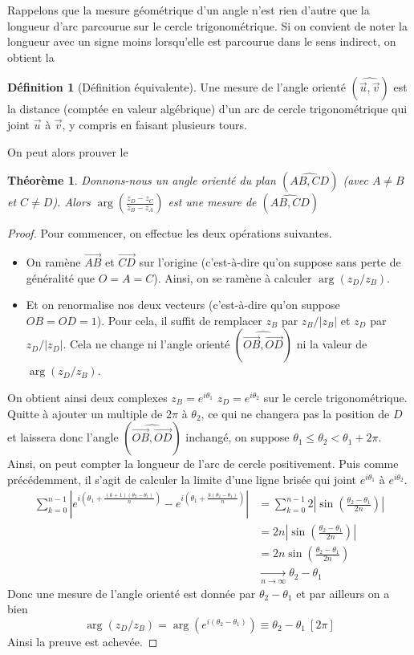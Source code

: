 \documentclass[french]{book}
\theoremstyle{plain}
\newtheorem{thm}{Théorème}[chapter]
\theoremstyle{definition}
\newtheorem{dfn}{Définition}[chapter]
\theoremstyle{remark}
\begin{document}
Rappelons que la mesure géométrique d'un angle n'est rien d'autre que la longueur d'arc parcourue sur le cercle trigonométrique. Si on convient de noter la longueur avec un signe moins lorsqu'elle est parcourue dans le sens indirect, on obtient la
\begin{dfn}[Définition équivalente]
	Une mesure de l'angle orienté $(\widehat{\overrightarrow{u},\overrightarrow{v}})$ est la distance (comptée en valeur algébrique) d'un arc de cercle trigonométrique qui joint $\overrightarrow{u}$ à $\overrightarrow{v}$, y compris en faisant plusieurs tours.
\end{dfn}

On peut alors prouver le
\begin{thm}
	Donnons-nous un angle orienté du plan $(\widehat{AB,CD})$ (avec $A \neq B$ et $C \neq D$). Alors $\displaystyle\arg\left(\frac{z_{D}-z_{C}}{z_{B}-z_{A}}\right)$ est une mesure de $(\widehat{AB,CD})$
\end{thm}
\begin{proof}
	Pour commencer, on effectue les deux opérations suivantes.
	\begin{itemize}
		\item On ramène $\overrightarrow{AB}$ et $\overrightarrow{CD}$ sur l'origine (c'est-à-dire qu'on suppose sans perte de généralité que $O=A=C$). Ainsi, on se ramène à calculer $\arg(z_{D}/z_{B})$.
		\item Et on renormalise nos deux vecteurs (c'est-à-dire qu'on suppose $OB=OD=1$). Pour cela, il suffit de remplacer $z_{B}$ par $z_{B}/|z_{B}|$ et $z_{D}$ par $z_{D}/|z_{D}|$. Cela ne change ni l'angle orienté $(\displaystyle\widehat{\overrightarrow{OB},\overrightarrow{OD}})$ ni la valeur de $\arg(z_{D}/z_{B})$.
	\end{itemize}
	On obtient ainsi deux complexes $z_{B}=e^{i\theta_{1}}$ $z_{D}=e^{i\theta_{2}}$ sur le cercle trigonométrique. Quitte à ajouter un multiple de $2\pi$ à $\theta_{2}$, ce qui ne changera pas la position de $D$ et laissera donc l'angle $(\widehat{\overrightarrow{OB},\overrightarrow{OD}})$ inchangé, on suppose $\theta_{1}\leq\theta_{2}<\theta_{1}+2\pi$. Ainsi, on peut compter la longueur de l'arc de cercle positivement. Puis comme précédemment, il s'agit de calculer la limite d'une ligne brisée qui joint $e^{i\theta_{1}}$ à $e^{i\theta_{2}}$.
	\begin{align*}
		\sum_{k=0}^{n-1}\left\lvert e^{i\left(\theta_1+\frac{(k+1)(\theta_2-\theta_1)}{n}\right)}-e^{i\left(\theta_1+\frac{k(\theta_2-\theta_1)}{n}\right)}\right\rvert&= \sum_{k=0}^{n-1} 2 \left\lvert\sin\left(\frac{\theta_{2}-\theta_{1}}{2n}\right)\right\rvert \\
		&= 2n \left\lvert\sin\left(\frac{\theta_{2}-\theta_{1}}{2n}\right)\right\rvert \\
		&= 2n\sin\left(\frac{\theta_{2}-\theta_{1}}{2n}\right) \\
		&\xrightarrow[n\to\infty]{} \theta_{2}-\theta_{1}
	\end{align*}
	Donc une mesure de l'angle orienté est donnée par $\theta_{2}-\theta_{1}$ et par ailleurs on a bien
	$$\arg(z_{D}/z_{B}) = \arg\left(e^{i(\theta_{2}-\theta_{1})}\right) \equiv \theta_{2}-\theta_{1}\ [2\pi]$$
	Ainsi la preuve est achevée.
\end{proof}
\end{document}
